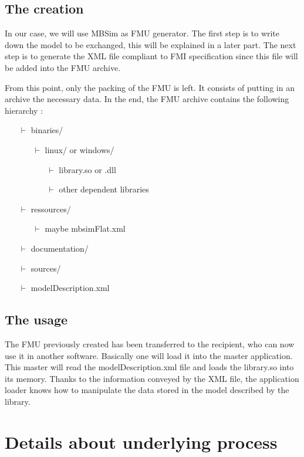 \documentclass[10pt,a4paper]{report}
\begin{document}
\subsection*{The creation}
In our case, we will use MBSim as FMU generator. The first step is to write down the model to be exchanged, this will be explained in a later part. The next step is to generate the XML file compliant to FMI specification since this file will be added into the FMU archive.\par
%
From this point, only the packing of the FMU is left. It consists of putting in an archive the necessary data. In the end, the FMU archive contains the following hierarchy :
\begin{itemize}
\item[$\vdash$] binaries/
	\begin{itemize}
	\item[$\vdash$] linux/ or windows/
		\begin{itemize}
		\item[$\vdash$] library.so or .dll
		\item[$\vdash$] other dependent libraries
		\end{itemize}
	\end{itemize}
\item[$\vdash$] ressources/
	\begin{itemize}
	\item[$\vdash$] maybe mbsimFlat.xml
	\end{itemize}
\item[$\vdash$] documentation/
\item[$\vdash$] sources/
\item[$\vdash$] modelDescription.xml
\end{itemize}
%
\subsection*{The usage}
The FMU previously created has been transferred to the recipient, who can now use it in another software. Basically one will load it into the master application. This master will read the modelDescription.xml file and loads the library.so into its memory. Thanks to the information conveyed by the XML file, the application loader knows how to manipulate the data stored in the model described by the library.
%
\section{Details about underlying process}
%
\end{document}
